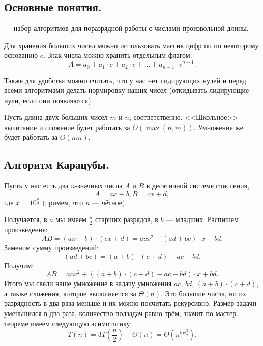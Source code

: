 \subsection{Основные понятия.}
\begin{definition}
   --- набор алгоритмов для поразрядной работы с числами
  произвольной длины.
\end{definition}

\begin{remark}
  Для хранения больших чисел можно использовать массив цифр по по некоторому основанию $c$. 
  Знак числа можно хранить отдельным флагом.
  \[
    A = a_0 + a_1 \cdot c + a_2 \cdot c + \ldots + a_{n-1} \cdot c^{n - 1}
  .\] 
\end{remark}

Также для удобства можно считать, что у нас нет лидирующих нулей и перед всеми алгоритмами
делать нормировку наших чисел (откидывать лидирующие нули, если они появляются).

\begin{remark}
  Пусть длина двух больших чисел $m$ и $n$, соответственно. 
  <<Школьное>> вычитание и сложение будет работать за $O(\max(n, m))$. Умножение же будет работать за
  $O(nm)$.
\end{remark}

\subsection{Алгоритм Карацубы.}
Пусть у нас есть два $n$-значных числа $A$ и $B$ в десятичной системе счисления, 
\[
A = ax + b, B = cx + d
,\] 
где $x = 10^{\frac{n}{2}}$ (примем, что $n$ --- чётное).

Получается, в $a$ мы имеем $\frac{n}{2}$ старших разрядов, в $b$ --- младших.
Распишем произведение:
\[
  AB = (ax + b) \cdot (cx + d) = acx^2 + (ad + bc) \cdot x + bd
.\] 
Заменим сумму произведений:
\[
  (ad + bc) = (a + b) \cdot (c + d) - ac - bd
.\] 
Получим:
\[
  AB = acx^2 + ((a + b) \cdot (c + d) - ac - bd) \cdot x + bd
.\] 
Итого мы свели наше умножение в задачу умножения $ac$, $bd$, $(a + b) \cdot (c + d)$, а также сложения, 
которое выполняется за $\Theta(n)$.
Это большие числа, но их разрядность в два раза меньше и их можно посчитать рекурсивно.
Размер задачи уменьшился в два раза, количество подзадач равно трём, значит по мастер-теореме имеем следующую
асимптотику:
 \[
   T(n) = 3T\left(\frac{n}{2}\right) + \Theta(n) = \Theta\left(n^{\log_{2}^3}\right)
.\] 

